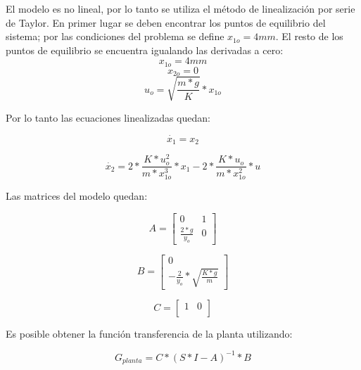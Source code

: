 El modelo es no lineal, por lo tanto se utiliza el método de linealización por serie de Taylor. En primer lugar se deben encontrar los puntos de equilibrio del sistema; por las condiciones del problema se define $x_{1o}=4mm$. El resto de los puntos de equilibrio se encuentra igualando las derivadas a cero:
\begin{equation}
	x_{1o}=4mm
\end{equation}
\begin{equation}
	x_{2o}=0
\end{equation}
\begin{equation}
	u_{o}=\sqrt{\frac{m*g}{K}}*x_{1o}
\end{equation}

Por lo tanto las ecuaciones linealizadas quedan:

\begin{equation}
	\dot{x_{1}}=x_{2}
\end{equation}

\begin{equation}
	\dot{x_{2}}=2*\frac{K*u_{o}^{2}}{m*x_{1o}^{3}}*x_{1}-2*\frac{K*u_{o}}{m*x_{1o}^{2}}*u
\end{equation}

Las matrices del modelo quedan:

\begin{equation}
	A=\begin{bmatrix}
		0 & 1\\
		\frac{2*g}{y_{o}} & 0
	\end{bmatrix}
\end{equation}

\begin{equation}
	B=\begin{bmatrix}
		0\\
		-\frac{2}{y_{o}}*\sqrt{\frac{K*g}{m}}
	\end{bmatrix}
\end{equation}

\begin{equation}
	C=\begin{bmatrix}
		1 & 0\\
	\end{bmatrix}
\end{equation}

\noindent Es posible obtener la función transferencia de la planta utilizando:

\begin{equation}\label{eq_transferencia_planta}
	G_{planta}=C*(S*I-A)^{-1}*B
\end{equation}

